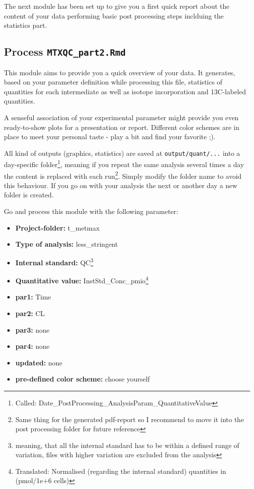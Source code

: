\documentclass[]{book}
\providecommand{\tightlist}{%
  \setlength{\itemsep}{0pt}\setlength{\parskip}{0pt}}
\let\rmarkdownfootnote\footnote%
\def\footnote{\protect\rmarkdownfootnote}
\theoremstyle{definition}
\theoremstyle{definition}
\theoremstyle{definition}
\theoremstyle{remark}
\begin{document}
The next module has been set up to give you a first quick report about
the content of your data performing basic post processing steps
inclduing the statistics part.

\subsection{\texorpdfstring{Process
\texttt{MTXQC\_part2.Rmd}}{Process MTXQC\_part2.Rmd}}\label{process-mtxqc_part2.rmd-1}

This module aims to provide you a quick overview of your data. It
generates, based on your parameter definition while processing this
file, statistics of quantities for each intermediate as well as isotope
incorporation and 13C-labeled quantities.

A senseful association of your experimental parameter might provide you
even ready-to-show plots for a presentation or report. Different color
schemes are in place to meet your personal taste - play a bit and find
your favorite ;).

All kind of outputs (graphics, statistics) are saved at
\texttt{output/quant/...} into a day-specific folder\footnote{Called:
  Date\_PostProcessing\_AnalysisParam\_QuantitativeValue}, meaning if
you repeat the same analysis several times a day the content is replaced
with each run\footnote{Same thing for the generated pdf-report so I
  recommend to move it into the post processing folder for future
  reference}. Simply modify the folder name to avoid this behaviour. If
you go on with your analysis the next or another day a new folder is
created.

Go and process this module with the following parameter:

\begin{itemize}
\tightlist
\item
  \textbf{Project-folder:} t\_metmax
\item
  \textbf{Type of analysis:} less\_stringent
\item
  \textbf{Internal standard:} QC\footnote{meaning, that all the internal
    standard has to be within a defined range of variation, files with
    higher variation are excluded from the analysis}
\item
  \textbf{Quantitative value:} InstStd\_Conc\_pmio\footnote{Translated:
    Normalised (regarding the internal standard) quantities in
    (pmol/1e+6 cells)}
\item
  \textbf{par1:} Time
\item
  \textbf{par2:} CL
\item
  \textbf{par3:} none
\item
  \textbf{par4:} none
\item
  \textbf{updated:} none
\item
  \textbf{pre-defined color scheme:} choose yourself
\end{itemize}
\end{document}
